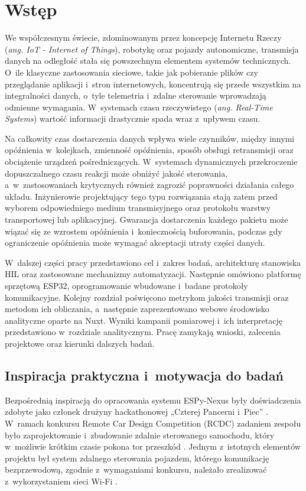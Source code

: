 \chapter{Wstęp}

We współczesnym świecie, zdominowanym przez koncepcję Internetu Rzeczy (\textit{ang. IoT - Internet of Things}), robotykę oraz pojazdy autonomiczne, transmisja danych na odległość stała się powszechnym elementem systemów technicznych.
O~ile klasyczne zastosowania sieciowe, takie jak pobieranie plików czy przeglądanie aplikacji i~stron internetowych, koncentrują się przede wszystkim na integralności danych, o~tyle telemetria i~zdalne sterowanie wprowadzają odmienne wymagania.
W~systemach czasu rzeczywistego (\textit{ang. Real-Time Systems}) wartość informacji drastycznie spada wraz z~upływem czasu.

Na całkowity czas dostarczenia danych wpływa wiele czynników, między innymi opóźnienia w~kolejkach, zmienność opóźnienia, sposób obsługi retransmisji oraz obciążenie urządzeń pośredniczących.
W~systemach dynamicznych przekroczenie dopuszczalnego czasu reakcji może obniżyć jakość sterowania, a~w~zastosowaniach krytycznych również zagrozić poprawności działania całego układu.
Inżynierowie projektujący tego typu rozwiązania stają zatem przed wyborem odpowiedniego medium transmisyjnego oraz protokołu warstwy transportowej lub aplikacyjnej.
Gwarancja dostarczenia każdego pakietu może wiązać się ze wzrostem opóźnienia i~koniecznością buforowania, podczas gdy ograniczenie opóźnienia może wymagać akceptacji utraty części danych.

W~dalszej części pracy przedstawiono cel i~zakres badań, architekturę stanowiska HIL oraz zastosowane mechanizmy automatyzacji.
Następnie omówiono platformę sprzętową ESP32, oprogramowanie wbudowane i~badane protokoły komunikacyjne.
Kolejny rozdział poświęcono metrykom jakości transmisji oraz metodom ich obliczania, a~następnie zaprezentowano webowe środowisko analityczne oparte na Nuxt.
Wyniki kampanii pomiarowej i~ich interpretację przedstawiono w~rozdziale analitycznym.
Pracę zamykają wnioski, zalecenia projektowe oraz kierunki dalszych badań.

\section{Inspiracja praktyczna i~motywacja do badań}

Bezpośrednią inspiracją do opracowania systemu ESPy-Nexus były doświadczenia zdobyte jako członek drużyny hackathonowej „Czterej Pancerni i~Piec” \cite{czterej_pancerni_i_piec}.
W~ramach konkursu Remote Car Design Competition (RCDC) zadaniem zespołu było zaprojektowanie i~zbudowanie zdalnie sterowanego samochodu, który w~możliwie krótkim czasie pokona tor przeszkód \cite{rcdc_official}.
Jednym z~istotnych elementów projektu był system zdalnego sterowania pojazdem, którego komunikację bezprzewodową, zgodnie z~wymaganiami konkursu, należało zrealizować z~wykorzystaniem sieci Wi-Fi \cite{rcdc_2025_team_repository}.

